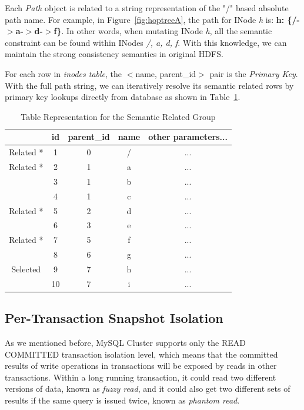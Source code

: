 \documentclass[runningheads,a4paper]{llncs}
\begin{document}
Each \textit{Path} object is related to a string representation of the "/" based absolute path name. For example, in Figure~\ref{fig:hoptreeA}, the path for INode \textit{h} is: \textbf{h: \{/-$>$a-$>$d-$>$f\}}. In other words, when mutating INode \textit{h}, all the semantic constraint can be found within INodes \textit{/, a, d, f}. With this knowledge, we can maintain the strong consistency semantics in original HDFS.

For each row in \textit{inodes table}, the $<$name, parent\_id$>$ pair is the \textit{Primary Key}. With the full path string, we can iteratively resolve its semantic related rows by primary key lookups directly from database as shown in Table~\ref{table:semanticrelatedTableA}.

\begin{table}[h]
	\centering
	\begin{tabular}{|c|c|c|c|c|}
		\hline
		~ & \textbf{id} & \textbf{parent\_id} & \textbf{name} & \textbf{other parameters...} \\ \hline
		Related * & 1 & 0 & / & ... \\ \hline
		Related * & 2 & 1 & a & ... \\ \hline
		~ & 3 & 1 & b & ... \\ \hline
		~ & 4 & 1 & c & ... \\ \hline
		Related * & 5 & 2 & d & ... \\ \hline
		~ & 6 & 3 & e & ... \\ \hline
		Related * & 7 & 5 & f & ... \\ \hline
		~ & 8 & 6 & g & ... \\ \hline
		Selected \checkmark & 9 & 7 & h & ... \\ \hline
		~ & 10 & 7 & i & ... \\ \hline
	\end{tabular}
	\caption{Table Representation for the Semantic Related Group}
	\label{table:semanticrelatedTableA}
\end{table}

\subsection{Per-Transaction Snapshot Isolation}

As we mentioned before, MySQL Cluster supports only the READ COMMITTED transaction isolation level, which means that the committed results of write operations in transactions will be exposed by reads in other transactions. Within a long running transaction, it could read two different versions of data, known as \textit{fuzzy read}, and it could also get two different sets of results if the same query is issued twice, known as \textit{phantom read}.
\end{document}

